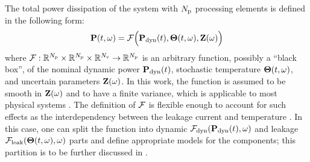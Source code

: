 The total power dissipation of the system with ${N_\text{p}}$ processing elements is defined in the following form:
\begin{equation} \elabel{power-model}
  \vP(\t, \o) = \f\Big(\vP_\dyn(\t), \vTO(\t, \o), \vZ(\o)\Big)
\end{equation}
where $\mathcal{F}: \mathbb{R}^{N_\text{p}} \times \mathbb{R}^{N_\text{p}} \times \mathbb{R}^{N_\text{v}} \to \mathbb{R}^{N_\text{p}}$ is an arbitrary function, possibly a ``black box'', of the nominal dynamic power $\mathbf{P}_{\text{dyn}}(t)$, stochastic temperature ${\boldsymbol\Theta}(t, \omega)$, and uncertain parameters $\mathbf{Z}(\omega)$. In this work, the function is assumed to be smooth in $\mathbf{Z}(\omega)$ and to have a finite variance, which is applicable to most physical systems \cite{xiu2002}. The definition of $\mathcal{F}$ is flexible enough to account for such effects as the interdependency between the leakage current and temperature \cite{srivastava2010, liu2007}. In this case, one can split the function into dynamic $\mathcal{F}_{\text{dyn}}(\mathbf{P}_{\text{dyn}}(t), \omega)$ and leakage $\mathcal{F}_{\text{leak}}({\boldsymbol\Theta}(t, \omega), \omega)$ parts and define appropriate models for the components; this partition is to be further discussed in .

